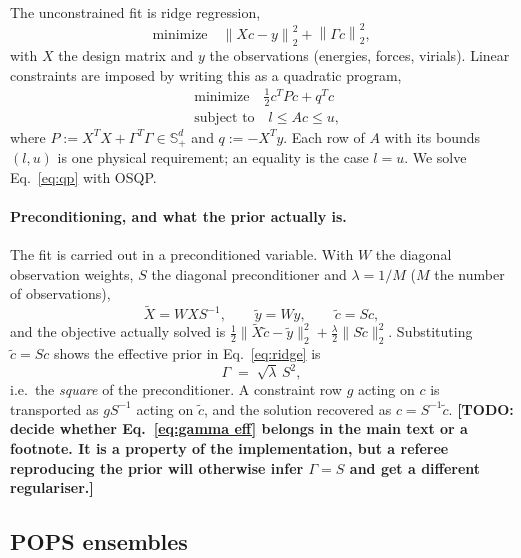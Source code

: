 \documentclass{article}
\newcommand{\TODO}[1]{{\color{blue}\textbf{[TODO: #1]}}}
\begin{document}
The unconstrained fit is ridge regression,
\begin{equation}
  \text{minimize}\quad \left\| Xc-y \right\|_2^2 + \left\| \Gamma c \right\|_2^2 ,
  \label{eq:ridge}
\end{equation}
with $X$ the design matrix and $y$ the observations (energies, forces, virials).
Linear constraints are imposed by writing this as a quadratic program,
\begin{equation}
\begin{split}
    & \text{minimize} \quad \tfrac{1}{2}c^{T} P c + q^{T}c \\
    & \text{subject to} \quad l \leq Ac \leq u,
\end{split}
\label{eq:qp}
\end{equation}
where $P := X^{T}X + \Gamma^{T}\Gamma \in \mathbb{S}_+^d$ and $q := -X^{T}y$.
Each row of $A$ with its bounds $(l,u)$ is one physical requirement; an equality
is the case $l=u$. We solve Eq.~\eqref{eq:qp} with OSQP.

\paragraph{Preconditioning, and what the prior actually is.}
The fit is carried out in a preconditioned variable. With $W$ the diagonal
observation weights, $S$ the diagonal preconditioner and $\lambda = 1/M$ ($M$ the
number of observations),
\begin{equation}
  \tilde X = W X S^{-1}, \qquad \tilde y = W y, \qquad \tilde c = S c ,
\end{equation}
and the objective actually solved is
$\tfrac12\|\tilde X\tilde c - \tilde y\|_2^2 + \tfrac{\lambda}{2}\|S\tilde c\|_2^2$.
Substituting $\tilde c = Sc$ shows the effective prior in Eq.~\eqref{eq:ridge} is
\begin{equation}
  \Gamma \;=\; \sqrt{\lambda}\, S^{2},
  \label{eq:gamma eff}
\end{equation}
i.e.\ the \emph{square} of the preconditioner. A constraint row $g$ acting on $c$
is transported as $gS^{-1}$ acting on $\tilde c$, and the solution recovered as
$c = S^{-1}\tilde c$.
\TODO{decide whether Eq.~\eqref{eq:gamma eff} belongs in the main text or a
footnote. It is a property of the implementation, but a referee reproducing the
prior will otherwise infer $\Gamma = S$ and get a different regulariser.}

\subsection{POPS ensembles}
\end{document}
